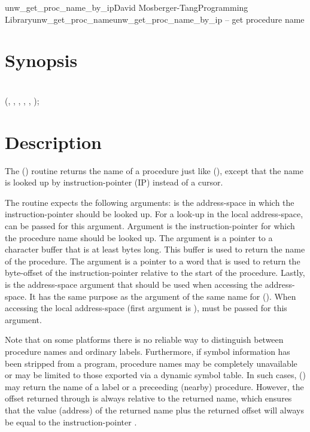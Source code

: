 \documentclass{article}
\begin{document}
\begin{Name}{3}{unw\_get\_proc\_name\_by\_ip}{David Mosberger-Tang}{Programming Library}{unw\_get\_proc\_name}unw\_get\_proc\_name\_by\_ip -- get procedure name
\end{Name}

\section{Synopsis}

\\

 (, , ,  , , );\\

\section{Description}

The () routine returns the name of
a procedure just like (), except that the
name is looked up by instruction-pointer (IP) instead of a cursor.

The routine expects the following arguments:  is the
address-space in which the instruction-pointer should be looked up.
For a look-up in the local address-space,
 can be passed for this argument.
Argument  is the instruction-pointer for which the procedure
name should be looked up.  The  argument is a pointer to
a character buffer that is at least  bytes long.  This buffer
is used to return the name of the procedure.  The  argument
is a pointer to a word that is used to return the byte-offset of the
instruction-pointer relative to the start of the procedure.
Lastly,  is the address-space argument that should be used
when accessing the address-space.  It has the same purpose as the
argument of the same name for ().  When
accessing the local address-space (first argument is
),  must be passed for this
argument.

Note that on some platforms there is no reliable way to distinguish
between procedure names and ordinary labels.  Furthermore, if symbol
information has been stripped from a program, procedure names may be
completely unavailable or may be limited to those exported via a
dynamic symbol table.  In such cases,
() may return the name of a label
or a preceeding (nearby) procedure.  However, the offset returned
through  is always relative to the returned name, which
ensures that the value (address) of the returned name plus the
returned offset will always be equal to the instruction-pointer
.
\end{document}
